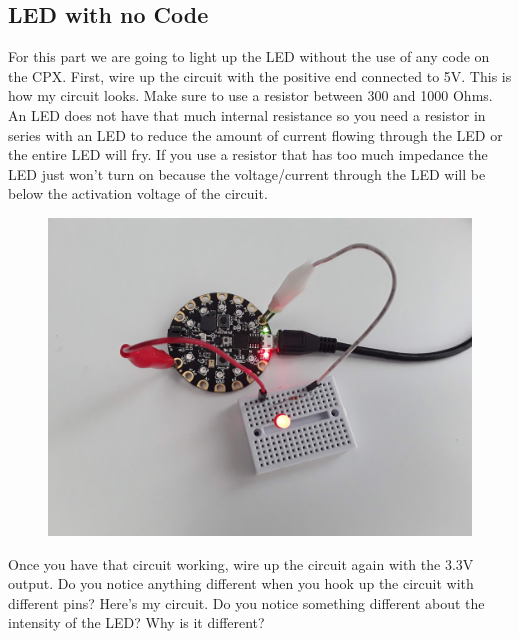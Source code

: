 \subsection{LED with no Code}

For this part we are going to light up the LED without the use of any
code on the CPX. First, wire up the circuit with the positive end
connected to 5V. This is how my circuit looks. Make sure to use a
resistor between 300 and 1000 Ohms. An LED does not have that much
internal resistance so you need a resistor in series with an LED to
reduce the amount of current flowing through the LED or the entire LED
will fry. If you use a resistor that has too much impedance the LED
just won’t turn on because the voltage/current through the LED will be
below the activation voltage of the circuit. 
\begin{figure}[H]
  \begin{center}
    \includegraphics[width=\textwidth]{Figures/LED1.jpeg}
  \end{center}
\end{figure}
Once you have that circuit working, wire up the circuit again with the
3.3V output. Do you notice anything different when you hook up the
circuit with different pins? Here’s my circuit. Do you notice
something different about the intensity of the LED? Why is it
different?
